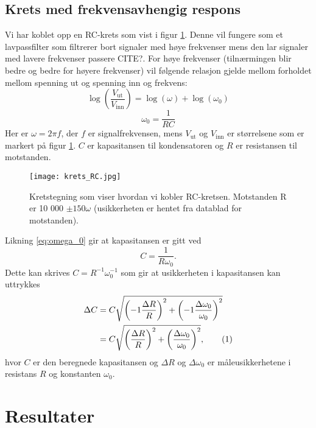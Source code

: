 \documentclass[reprint, english,notitlepage]{revtex4-1}  %
\newcommand\numberthis{\addtocounter{equation}{1}\tag{\theequation}}
\begin{document}
\subsection{Krets med frekvensavhengig respons}
Vi har koblet opp en RC-krets som vist i figur \ref{fig:krets_RC}. Denne vil fungere som et lavpassfilter som filtrerer bort signaler med høye frekvenser mens den lar signaler med lavere frekvenser passere CITE?. For høye frekvenser (tilnærmingen blir bedre og bedre for høyere frekvenser) vil følgende relasjon gjelde mellom forholdet mellom spenning ut og spenning inn og frekvens:
\begin{equation}
  \log \left( \frac{V_{\text{ut}}}{V_{\text{inn}}} \right) = \log (\omega) + \log (\omega_0) \label{eq:lavpass}
\end{equation}
\begin{equation}
  \omega_0 = \frac{1}{RC} \label{eq:omega_0}
\end{equation}
Her er $\omega = 2 \pi f$, der $f$ er signalfrekvensen, mens $V_{\text{ut}}$ og $V_{\text{inn}}$ er størrelsene som er markert på figur \ref{fig:krets_RC}. $C$ er kapasitansen til kondensatoren og $R$ er resistansen til motstanden.
\begin{figure}
  \texttt{[image: krets\_RC.jpg]}
  \caption{Kretstegning som viser hvordan vi kobler RC-kretsen. Motstanden R er 10 000 $\pm 150 \omega$ (usikkerheten er hentet fra datablad for motstanden).}
  \label{fig:krets_RC}
\end{figure}


Likning \ref{eq:omega_0} gir at kapasitansen er gitt ved
\begin{equation}
  \label{eq:kapasitans}
  C = \frac{1}{R \omega_0}.
\end{equation}
Dette kan skrives $C = R^{-1} \omega_0^{-1}$ som gir at usikkerheten i kapasitansen kan uttrykkes
\begin{align*}
  \Delta C &= C \sqrt{\left( -1 \frac{\Delta R}{R} \right) ^2 + \left( -1 \frac{\Delta \omega_0}{\omega_0} \right) ^2} \\
  &= C \sqrt{\left( \frac{\Delta R}{R} \right) ^2 + \left( \frac{\Delta \omega_0}{\omega_0} \right) ^2}, \numberthis \label{eq:usikkerhet_C}
\end{align*}
hvor $C$ er den beregnede kapasitansen og $\Delta R$ og $\Delta \omega_0$ er måleusikkerhetene i resistans $R$ og konstanten $\omega_0$.


\section{Resultater}
\end{document}
